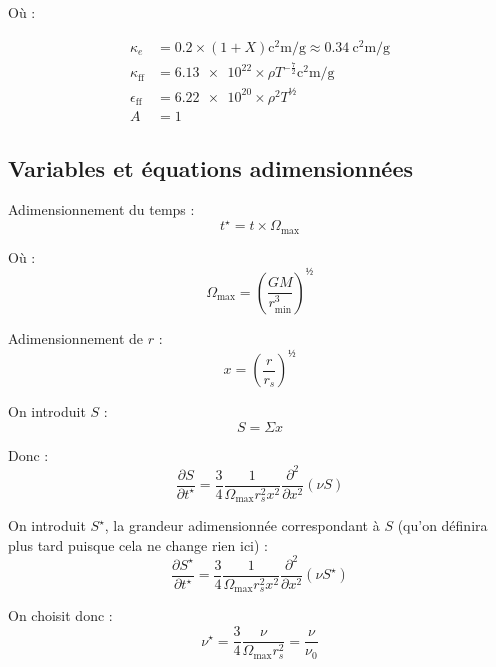 Où :

\begin{align}
    \kappa_e &= \num{0.2} × (1+X) \si{\square\centi\meter\per\gram} \approx \SI{0.34}{\square\centi\meter\per\gram} \\
    \kappa_\mathrm{ff} &= \num{6.13e22} × \rho T^{-\frac{7}{2}} \si{\square\centi\meter\per\gram}\\
    \epsilon_\mathrm{ff} &= \num{6.22e20} × \rho^2 T^½ \\
    A &= 1
\end{align}

\subsection{Variables et équations adimensionnées}

Adimensionnement du temps :
\begin{equation}
    t^\star = t × \Omega_\mathrm{max}
\end{equation}

Où :
\begin{equation}
    \Omega_\mathrm{max} = \left( \frac{G M}{r^3_\mathrm{min}} \right)^½
\end{equation}

Adimensionnement de $r$ :
\begin{equation}
    x = \left( \frac{r}{r_s} \right)^½
\end{equation}

On introduit $S$ :
\begin{equation}
    S = \Sigma x
\end{equation}

Donc :
\begin{equation}
    \frac{\partial S}{\partial t^\star} = \frac{3}{4} \frac{1}{\Omega_\mathrm{max} r_s^2 x^2} \frac{\partial^2}{\partial x^2} \left(\nu S\right)
\end{equation}

On introduit $S^\star$, la grandeur adimensionnée correspondant à $S$ (qu’on définira plus tard puisque cela ne change rien ici) :
\begin{equation}
    \frac{\partial S^\star}{\partial t^\star} = \frac{3}{4} \frac{1}{\Omega_\mathrm{max} r_s^2 x^2} \frac{\partial^2}{\partial x^2} \left(\nu S^\star\right)
\end{equation}

On choisit donc :
\begin{equation}
    \nu^\star = \frac{3}{4} \frac{\nu}{\Omega_\mathrm{max} r_s^2} = \frac{\nu}{\nu_0}
\end{equation}

